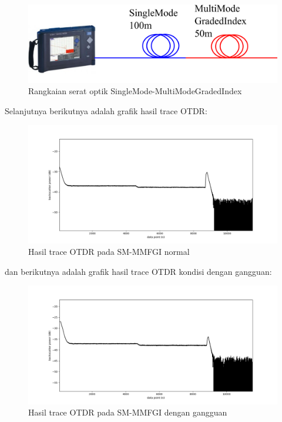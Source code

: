 \documentclass[12pt]{article}
\begin{document}
\begin{enumerate}
		\begin{figure}[!h]
			\centering
			\captionsetup{justification=centering}
			\includegraphics[width=0.6\linewidth]{images/Bab_4/smgi}
			\caption[Trace SMF-SMF]{\small{Rangkaian serat optik SingleMode-MultiModeGradedIndex}}
		\end{figure}
	
		Selanjutnya berikutnya adalah grafik hasil trace OTDR:
		
		\begin{figure}[!h]
			\centering
			\captionsetup{justification=centering}
			\includegraphics[width=0.9\linewidth]{images/Bab_4/Bab_4_3c1}
			\caption[Trace SM-MMFGI ]{\small{Hasil trace OTDR pada SM-MMFGI normal}}
		\end{figure}
	
		dan berikutnya adalah grafik hasil trace OTDR kondisi dengan gangguan:
		
		\begin{figure}[!h]
			\centering
			\captionsetup{justification=centering}
			\includegraphics[width=0.9\linewidth]{images/Bab_4/Bab_4_3c2}
			\caption[Trace SM-MMFGI ]{\small{Hasil trace OTDR pada SM-MMFGI dengan gangguan}}
		\end{figure}
	

\end{enumerate}
\end{document}
